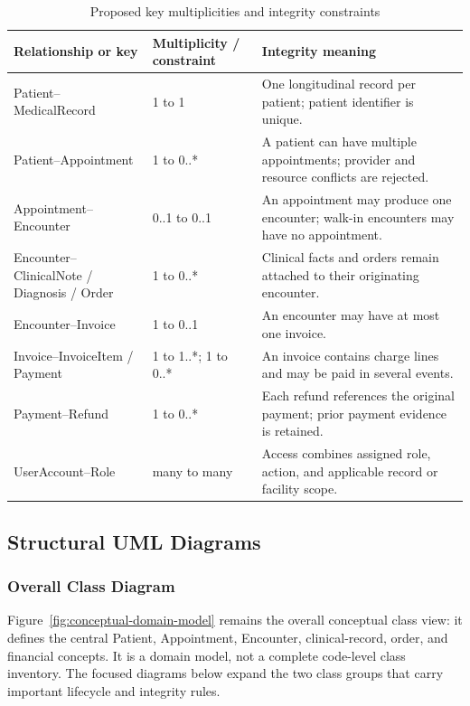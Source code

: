 \documentclass[a4paper,12pt]{article}
\begin{document}
\begin{table}[H]
\centering
\small
\renewcommand{\arraystretch}{1.12}
\begin{tabularx}{\textwidth}{@{}P{0.29\textwidth}P{0.20\textwidth}Y@{}}
\toprule
Relationship or key & Multiplicity / constraint & Integrity meaning \\
\midrule
Patient--MedicalRecord & 1 to 1 & One longitudinal record per patient; patient identifier is unique. \\
Patient--Appointment & 1 to 0..* & A patient can have multiple appointments; provider and resource conflicts are rejected. \\
Appointment--Encounter & 0..1 to 0..1 & An appointment may produce one encounter; walk-in encounters may have no appointment. \\
Encounter--ClinicalNote / Diagnosis / Order & 1 to 0..* & Clinical facts and orders remain attached to their originating encounter. \\
Encounter--Invoice & 1 to 0..1 & An encounter may have at most one invoice. \\
Invoice--InvoiceItem / Payment & 1 to 1..*; 1 to 0..* & An invoice contains charge lines and may be paid in several events. \\
Payment--Refund & 1 to 0..* & Each refund references the original payment; prior payment evidence is retained. \\
UserAccount--Role & many to many & Access combines assigned role, action, and applicable record or facility scope. \\
\bottomrule
\end{tabularx}
\caption{Proposed key multiplicities and integrity constraints}
\label{tab:data-integrity-constraints}
\end{table}

\subsection{Structural UML Diagrams}

\subsubsection{Overall Class Diagram}

Figure~\ref{fig:conceptual-domain-model} remains the overall conceptual class view: it defines the central Patient, Appointment, Encounter, clinical-record, order, and financial concepts. It is a domain model, not a complete code-level class inventory. The focused diagrams below expand the two class groups that carry important lifecycle and integrity rules.
\end{document}

